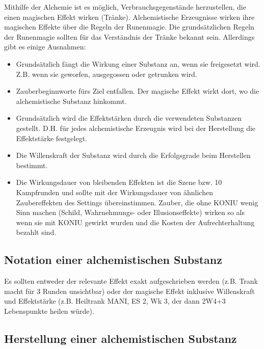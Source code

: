 \documentclass{article}
\begin{document}
Mithilfe der Alchemie ist es möglich, Verbrauchsgegenstände herzustellen, die einen magischen Effekt wirken (Tränke).
Alchemistische Erzeugnisse wirken ihre magischen Effekte über die Regeln der Runenmagie. Die grundsätzlichen Regeln
der Runenmagie sollten für das Verständnis der Tränke bekannt sein. Allerdings gibt es einige Ausnahmen:

\begin{itemize}
\item Grundsätzlich fängt die Wirkung einer Substanz an, wenn sie freigesetzt wird. Z.B. wenn sie geworfen, ausgegossen oder getrunken wird.
\item Zauberbeginnworte fürs Ziel entfallen. Der magische Effekt wirkt dort, wo die alchemistische Substanz hinkommt.
\item Grundsätzlich wird die Effektstärken durch die verwendeten Substanzen gestellt. D.H. für jedes alchemistische Erzeugnis wird bei der Herstellung die Effektstärke festgelegt.
\item Die Willenskraft der Substanz wird durch die Erfolgsgrade beim Herstellen bestimmt.
\item Die Wirkungsdauer von bleibenden Effekten ist die Szene bzw. 10 Kampfrunden und sollte mit der Wirkungsdauer von ähnlichen Zaubereffekten des Settings übereinstimmen. Zauber, die ohne KONIU wenig Sinn machen (Schild, Wahrnehmungs- oder Illusionseffekte) wirken so als wenn sie mit KONIU gewirkt wurden und die Kosten der Aufrechterhaltung bezahlt sind.
\end{itemize}

\begin{center}
\subsection{Notation einer alchemistischen Substanz}
\end{center}

Es sollten entweder der relevante Effekt exakt aufgeschrieben werden (z.B. Trank macht für 3 Runden unsichtbar) oder
der magische Effekt inklusive Willenskraft und Effektstärke (z.B. Heiltrank MANI, ES 2, Wk 3, der dann 2W4+3
Lebenspunkte heilen würde).

\begin{center}
\subsection{Herstellung einer alchemistischen Substanz}
\end{center}
\end{document}
